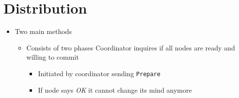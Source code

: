 
\section{Distribution}
\begin{itemize}
        \begin{itemize}
             Multiple DBs and a single coordinator which manages them
                \begin{itemize}
                    \item Atomcity of a single nodes does not imply atomcity in a distributed setting
                \end{itemize}
            \item Two main methods
                \begin{itemize}
                    \item Consists of two phases
                     Coordinator inquires if all nodes are ready and willing to commit
                        \begin{itemize}
                            \item Initiated by coordinator sending \verb+Prepare+
                            \item If node says \textit{OK} it cannot change its mind anymore
                        \end{itemize}


\end{itemize}
\end{itemize}
\end{itemize}
